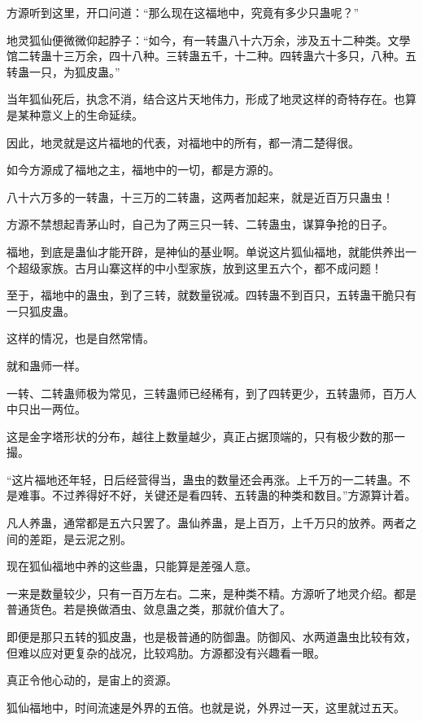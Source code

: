 
\begin{this_body}

方源听到这里，开口问道：“那么现在这福地中，究竟有多少只蛊呢？”

地灵狐仙便微微仰起脖子：“如今，有一转蛊八十六万余，涉及五十二种类。文學馆二转蛊十三万余，四十八种。三转蛊五千，十二种。四转蛊六十多只，八种。五转蛊一只，为狐皮蛊。”

当年狐仙死后，执念不消，结合这片天地伟力，形成了地灵这样的奇特存在。也算是某种意义上的生命延续。

因此，地灵就是这片福地的代表，对福地中的所有，都一清二楚得很。

如今方源成了福地之主，福地中的一切，都是方源的。

八十六万多的一转蛊，十三万的二转蛊，这两者加起来，就是近百万只蛊虫！

方源不禁想起青茅山时，自己为了两三只一转、二转蛊虫，谋算争抢的日子。

福地，到底是蛊仙才能开辟，是神仙的基业啊。单说这片狐仙福地，就能供养出一个超级家族。古月山寨这样的中小型家族，放到这里五六个，都不成问题！

至于，福地中的蛊虫，到了三转，就数量锐减。四转蛊不到百只，五转蛊干脆只有一只狐皮蛊。

这样的情况，也是自然常情。

就和蛊师一样。

一转、二转蛊师极为常见，三转蛊师已经稀有，到了四转更少，五转蛊师，百万人中只出一两位。

这是金字塔形状的分布，越往上数量越少，真正占据顶端的，只有极少数的那一撮。

“这片福地还年轻，日后经营得当，蛊虫的数量还会再涨。上千万的一二转蛊。不是难事。不过养得好不好，关键还是看四转、五转蛊的种类和数目。”方源算计着。

凡人养蛊，通常都是五六只罢了。蛊仙养蛊，是上百万，上千万只的放养。两者之间的差距，是云泥之别。

现在狐仙福地中养的这些蛊，只能算是差强人意。

一来是数量较少，只有一百万左右。二来，是种类不精。方源听了地灵介绍。都是普通货色。若是换做酒虫、敛息蛊之类，那就价值大了。

即便是那只五转的狐皮蛊，也是极普通的防御蛊。防御风、水两道蛊虫比较有效，但难以应对更复杂的战况，比较鸡肋。方源都没有兴趣看一眼。

真正令他心动的，是宙上的资源。

狐仙福地中，时间流速是外界的五倍。也就是说，外界过一天，这里就过五天。


\end{this_body}
